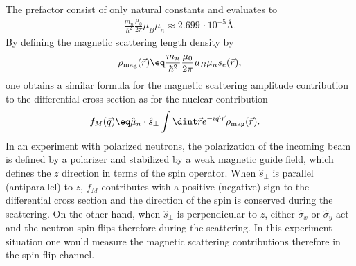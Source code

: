 \documentclass[\main/dresen_thesis.tex]{subfiles}
\begin{document}
    The prefactor consist of only natural constants and evaluates to
    \begin{align}
      \frac{m_n}{\hbar^2}  \frac{\mu_0}{2\pi} \mu_B \mu_n \approx 2.699\,\cdot 10^{-5} \unit{\angstrom}.
    \end{align}
    By defining the magnetic scattering length density by
    \begin{align}
      \rho_\mathrm{mag} (\vec{r}) \eq \frac{m_n}{\hbar^2}  \frac{\mu_0}{2\pi} \mu_B \mu_n s_e (\vec{r}),
    \end{align}
    one obtains a similar formula for the magnetic scattering amplitude contribution to the differential cross section as for the nuclear contribution
    \begin{align}
      f_M (\vec{q}) \eq & \hat{\mu}_n \cdot \hat{s}_\perp \int \dint \vec{r} e^{- i \vec{q} \cdot \vec{r}} \rho_\mathrm{mag}(\vec{r}).
    \end{align}
    In an experiment with polarized neutrons, the polarization of the incoming beam is defined by a polarizer and stabilized by a weak magnetic guide field, which defines the $z$ direction in terms of the spin operator.
    When $\hat{s}_\perp$ is parallel (antiparallel) to $z$, $f_M$ contributes with a positive (negative) sign to the differential cross section and the direction of the spin is conserved during the scattering.
    On the other hand, when $\hat{s}_\perp$ is perpendicular to $z$, either $\hat{\sigma}_x$ or $\hat{\sigma}_y$ act and the neutron spin flips therefore during the scattering.
    In this experiment situation one would measure the magnetic scattering contributions therefore in the spin-flip channel.
\end{document}
